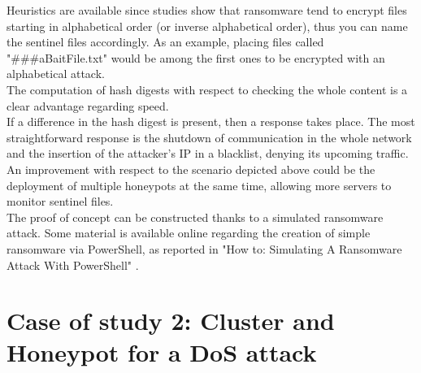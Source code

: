 Heuristics are available since studies show that ransomware tend to encrypt files starting in alphabetical order (or inverse alphabetical order), thus you can name the sentinel files accordingly. As an example, placing files called "\#\#\#aBaitFile.txt" would be among the first ones to be encrypted with an alphabetical attack.\\
The computation of hash digests with respect to checking the whole content is a clear advantage regarding speed.\\
If a difference in the hash digest is present, then a response takes place. The most straightforward response is the shutdown of communication in the whole network and the insertion of the attacker's IP in a blacklist, denying its upcoming traffic.\\
An improvement with respect to the scenario depicted above could be the deployment of multiple honeypots at the same time, allowing more servers to monitor sentinel files.\\
The proof of concept can be constructed thanks to a simulated ransomware attack. Some material is available online regarding the creation of simple ransomware via PowerShell, as reported in "How to: Simulating A Ransomware Attack With PowerShell" \cite{Howto}.



\section{Case of study 2: Cluster and Honeypot for a DoS attack}


